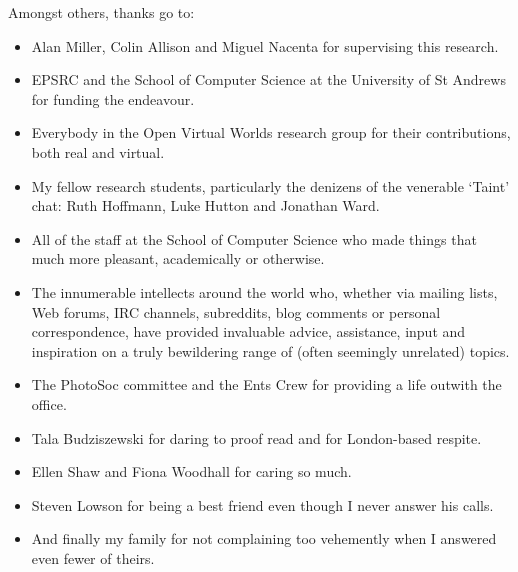 Amongst others, thanks go to:

\begin{itemize}

	\item Alan Miller, Colin Allison and Miguel Nacenta for supervising this research.
	
	\item EPSRC and the School of Computer Science at the University of St Andrews for funding the endeavour.
	
	\item Everybody in the Open Virtual Worlds research group for their contributions, both real and virtual.
	
	\item My fellow research students, particularly the denizens of the venerable `Taint' chat: Ruth Hoffmann, Luke Hutton and Jonathan Ward.
	
	\item All of the staff at the School of Computer Science who made things that much more pleasant, academically or otherwise.
	
	\item The innumerable intellects around the world who, whether via mailing lists, Web forums, IRC channels, subreddits, blog comments or personal correspondence, have provided invaluable advice, assistance, input and inspiration on a truly bewildering range of (often seemingly unrelated) topics.
	
	\item The PhotoSoc committee and the Ents Crew for providing a life outwith the office.
	
	\item Tala Budziszewski for daring to proof read and for London-based respite.
	
	\item Ellen Shaw and Fiona Woodhall for caring so much.
	
	\item Steven Lowson for being a best friend even though I never answer his calls.
	
	\item And finally my family for not complaining too vehemently when I answered even fewer of theirs.

\end{itemize}